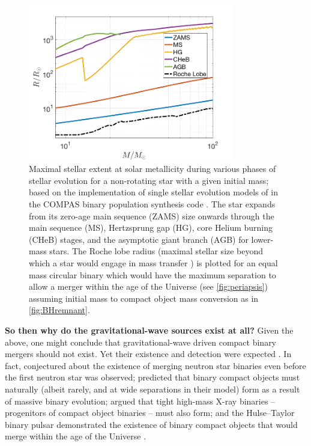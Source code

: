 \documentclass[review]{elsarticle}
\begin{document}
\begin{figure}
	\centering	
	\includegraphics[width=0.8\textwidth]{StellarRadiusZsolarRoche.png}
\caption{Maximal stellar extent at solar metallicity during various phases of stellar evolution for a non-rotating star with a given initial mass; based on the implementation of single stellar evolution models of \citet{Hurley:2000} in the COMPAS binary population synthesis code \citep{COMPAS:2021}.   The star expands from its zero-age main sequence (ZAMS) size onwards through the main sequence (MS), Hertzsprung gap (HG), core Helium burning (CHeB) stages, and the asymptotic giant branch (AGB) for lower-mass stars.  The Roche lobe radius (maximal stellar size beyond which a star would engage in mass transfer \citep{Eggleton:1983}) is plotted for an equal mass circular binary which would have the maximum separation to allow a merger within the age of the Universe (see \autoref{fig:periapsis}) assuming initial mass to compact object mass conversion as in \autoref{fig:BHremnant}.\label{fig:Rmax} }
\end{figure}

\textbf{So then why do the gravitational-wave sources exist at all?} Given the above, one might conclude that gravitational-wave driven compact binary mergers should not exist. Yet their existence and detection were expected \citep{ratesdoc}. In fact, \citet{Dyson:1962} conjectured about the existence of merging neutron star binaries even before the first neutron star was observed; \citet{Tutukov:1973} predicted that binary compact objects must naturally (albeit rarely, and at wide separations in their model) form as a result of massive binary evolution; \citet{vdHDeLoore:1973} argued that tight high-mass X-ray binaries -- progenitors of compact object binaries -- must also form; and the Hulse--Taylor binary pulsar \citep{HulseTaylor:1975} demonstrated the existence of binary compact objects that would merge within the age of the Universe \citep[for early explanations of its formation in the context of binary evolution, see][]{FlanneryvdH:1975,DeLoore:1975}.
\end{document}
